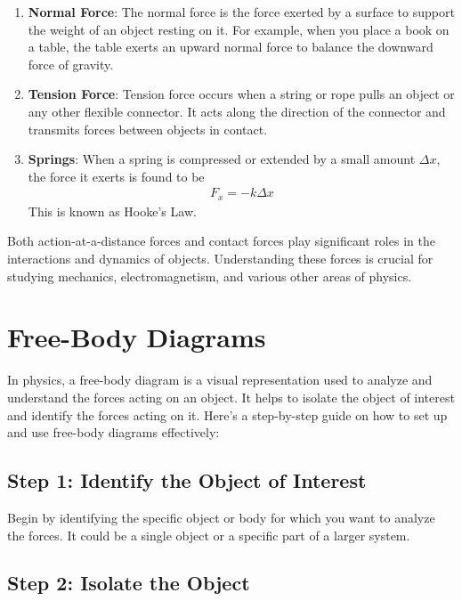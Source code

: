 \documentclass[11pt]{article}
\begin{document}
\begin{enumerate}
\item \textbf{Normal Force}: The normal force is the force exerted by a surface to support the weight of an object resting on it. For example, when you place a book on a table, the table exerts an upward normal force to balance the downward force of gravity.

\item \textbf{Tension Force}: Tension force occurs when a string or rope pulls an object or any other flexible connector. It acts along the direction of the connector and transmits forces between objects in contact.

\item \textbf{Springs}: When a spring is compressed or extended by a small amount $\Delta x$, the force it exerts is found to be
\begin{align*}
    F_x = -k\Delta x
\end{align*}
This is known as Hooke's Law.

\end{enumerate}

Both action-at-a-distance forces and contact forces play significant roles in the interactions and dynamics of objects. Understanding these forces is crucial for studying mechanics, electromagnetism, and various other areas of physics.

\section{Free-Body Diagrams}

In physics, a free-body diagram is a visual representation used to analyze and understand the forces acting on an object. It helps to isolate the object of interest and identify the forces acting on it. Here's a step-by-step guide on how to set up and use free-body diagrams effectively:

\subsection*{Step 1: Identify the Object of Interest}

Begin by identifying the specific object or body for which you want to analyze the forces. It could be a single object or a specific part of a larger system.

\subsection*{Step 2: Isolate the Object}
\end{document}
